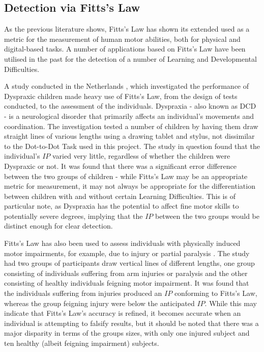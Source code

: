 		
	\subsection{Detection via Fitts’s Law}
		As the previous literature shows, Fitts’s Law has shown its extended used as a metric for the measurement of human motor abilities, both for physical and digital-based tasks. A number of applications based on Fitts’s Law have been utilised in the past for the detection of a number of Learning  and Developmental Difficulties.
		
		A study conducted in the Netherlands \cite{Smits-Engelsman2003}, which investigated the performance of Dyspraxic children made heavy use of Fitts’s Law, from the design of tests conducted, to the assessment of the individuals. Dyspraxia - also known as DCD - is a neurological disorder that primarily affects an individual’s movements and coordination. The investigation tested a number of children by having them draw straight lines of various lengths using a drawing tablet and stylus, not dissimilar to the Dot-to-Dot Task used in this project. The study in question found that the individual's \(IP\) varied very little, regardless of whether the children were Dyspraxic or not. It was found that there was a significant error difference between the two groups of children - while Fitts’s Law may be an appropriate metric for measurement, it may not always be appropriate for the differentiation between children with and without certain Learning Difficulties. This is of particular note, as Dyspraxia has the potential to affect fine motor skills to potentially severe degrees, implying that the \(IP\) between the two groups would be distinct enough for clear detection.
		
		
		Fitts’s Law has also been used to assess individuals with physically induced motor impairments, for example, due to injury or partial paralysis \cite{Maruff2000}. The study had two groups of participants draw vertical lines of different lengths, one group consisting of individuals suffering from arm injuries or paralysis and the other consisting of healthy individuals feigning motor impairment. It was found that the individuals suffering from injuries produced an \(IP\) conforming to Fitts’s Law, whereas the group feigning injury were below the anticipated \(IP\). While this may indicate that Fitts’s Law’s accuracy is refined, it becomes accurate when an individual is attempting to falsify results, but it should be noted that there was a major disparity in terms of the groups sizes, with only one injured subject and ten healthy (albeit feigning impairment) subjects.
		
